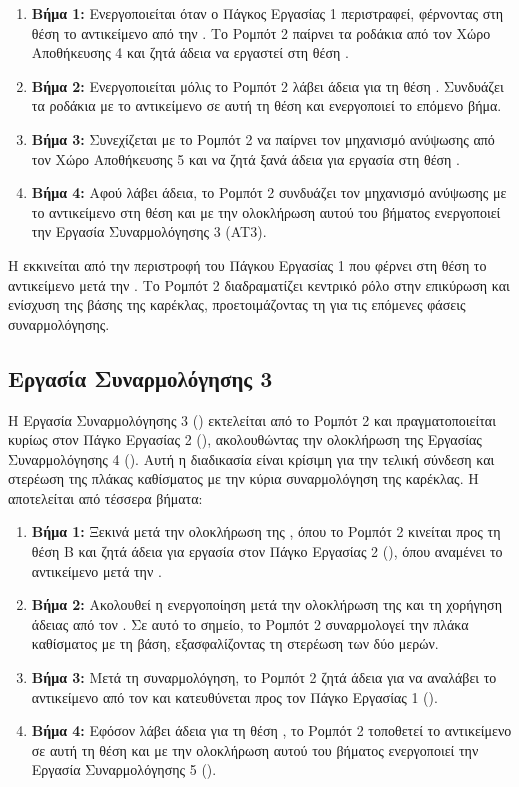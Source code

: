 \begin{enumerate}
  \item \textbf{Βήμα 1:} Ενεργοποιείται όταν ο Πάγκος Εργασίας 1 περιστραφεί, φέρνοντας στη θέση  το αντικείμενο από την . Το Ρομπότ 2 παίρνει τα ροδάκια από τον Χώρο Αποθήκευσης 4 και ζητά άδεια να εργαστεί στη θέση .
  \item \textbf{Βήμα 2:} Ενεργοποιείται μόλις το Ρομπότ 2 λάβει άδεια για τη θέση . Συνδυάζει τα ροδάκια με το αντικείμενο σε αυτή τη θέση και ενεργοποιεί το επόμενο βήμα.
  \item \textbf{Βήμα 3:} Συνεχίζεται με το Ρομπότ 2 να παίρνει τον μηχανισμό ανύψωσης από τον Χώρο Αποθήκευσης 5 και να ζητά ξανά άδεια για εργασία στη θέση .
  \item \textbf{Βήμα 4:} Αφού λάβει άδεια, το Ρομπότ 2 συνδυάζει τον μηχανισμό ανύψωσης με το αντικείμενο στη θέση  και με την ολοκλήρωση αυτού του βήματος ενεργοποιεί την Εργασία Συναρμολόγησης 3 (AT3).
\end{enumerate}

Η  εκκινείται από την περιστροφή του Πάγκου Εργασίας 1 που φέρνει στη θέση  το αντικείμενο μετά την . Το Ρομπότ 2 διαδραματίζει κεντρικό ρόλο στην επικύρωση και ενίσχυση της βάσης της καρέκλας, προετοιμάζοντας τη για τις επόμενες φάσεις συναρμολόγησης.

\subsection{Εργασία Συναρμολόγησης 3}
\noindent Η Εργασία Συναρμολόγησης 3 () εκτελείται από το Ρομπότ 2 και πραγματοποιείται κυρίως στον Πάγκο Εργασίας 2 (), ακολουθώντας την ολοκλήρωση της Εργασίας Συναρμολόγησης 4 (). Αυτή η διαδικασία είναι κρίσιμη για την τελική σύνδεση και στερέωση της πλάκας καθίσματος με την κύρια συναρμολόγηση της καρέκλας. Η  αποτελείται από τέσσερα βήματα:

\begin{enumerate}
  \item \textbf{Βήμα 1:} Ξεκινά μετά την ολοκλήρωση της , όπου το Ρομπότ 2 κινείται προς τη θέση Β και ζητά άδεια για εργασία στον Πάγκο Εργασίας 2 (), όπου αναμένει το αντικείμενο μετά την .
  \item \textbf{Βήμα 2:} Ακολουθεί η ενεργοποίηση μετά την ολοκλήρωση της  και τη χορήγηση άδειας από τον . Σε αυτό το σημείο, το Ρομπότ 2 συναρμολογεί την πλάκα καθίσματος με τη βάση, εξασφαλίζοντας τη στερέωση των δύο μερών.
  \item \textbf{Βήμα 3:} Μετά τη συναρμολόγηση, το Ρομπότ 2 ζητά άδεια για να αναλάβει το αντικείμενο από τον  και κατευθύνεται προς τον Πάγκο Εργασίας 1 ().
  \item \textbf{Βήμα 4:} Εφόσον λάβει άδεια για τη θέση , το Ρομπότ 2 τοποθετεί το αντικείμενο σε αυτή τη θέση και με την ολοκλήρωση αυτού του βήματος ενεργοποιεί την Εργασία Συναρμολόγησης 5 ().
\end{enumerate}

